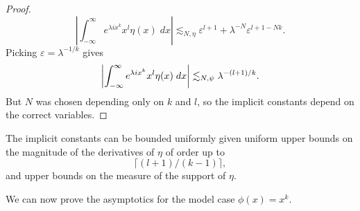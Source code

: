\begin{proof}
  \[ \left| \int_{-\infty}^\infty e^{\lambda i x^k} x^l \eta(x)\; dx \right| \lesssim_{N,\eta} \varepsilon^{l+1} + \lambda^{-N} \varepsilon^{l+1-Nk}. \]
  Picking $\varepsilon = \lambda^{-1/k}$ gives
  \[ \left| \int_{-\infty}^\infty e^{\lambda i x^k} x^l \eta(x)\; dx \right| \lesssim_{N,\psi} \lambda^{-(l+1)/k}. \qedhere \]
  But $N$ was chosen depending only on $k$ and $l$, so the implicit constants depend on the correct variables.
\end{proof}

\begin{remark}
  The implicit constants can be bounded uniformly given uniform upper bounds on the magnitude of the derivatives of $\eta$ of order up to
  \[ \lceil (l+1)/(k-1) \rceil, \]
  and upper bounds on the measure of the support of $\eta$.
\end{remark}

We can now prove the asymptotics for the model case $\phi(x) = x^k$.

